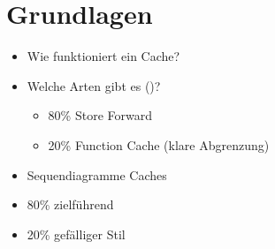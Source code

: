 \chapter{Grundlagen}
\label{cha:grundlagen}

\begin{itemize}
\item Wie funktioniert ein Cache?
\item Welche Arten gibt es ()?
\begin{itemize}
\item 80\% Store Forward 
\item 20\% Function Cache (klare Abgrenzung)
\end{itemize}
\item Sequendiagramme Caches
\end{itemize}

\begin{itemize}
\item 80\% zielführend
\item 20\% gefälliger Stil
\end{itemize}
